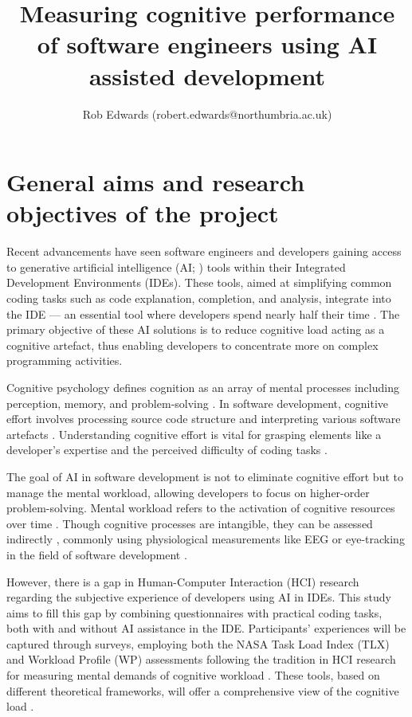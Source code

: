 \documentclass[man]{apa7}
\title{Measuring cognitive performance of software engineers using AI assisted development}
\author{Rob Edwards (robert.edwards@northumbria.ac.uk)}
\affiliation{
    Module: PE7024 - Psychological Research Experience,
    Psychology Department at Northumbria University,
    Module Lead: Dr David Smailes,
    Supervisor: ,
   }
\begin{document}
\maketitle
\onecolumn

\section{General aims and research objectives of the project}
Recent advancements have seen software engineers and developers gaining access to generative artificial intelligence (AI; \cite{Nguyen-Duc2023GenerativeAgenda}) tools within their Integrated Development Environments (IDEs). These tools, aimed at simplifying common coding tasks such as code explanation, completion, and analysis, integrate into the IDE — an essential tool where developers spend nearly half their time \parencite{Meyer2017TheProductivity}. The primary objective of these AI solutions is to reduce cognitive load acting as a cognitive artefact, thus enabling developers to concentrate more on complex programming activities.

Cognitive psychology defines cognition as an array of mental processes including perception, memory, and problem-solving \parencite{Roy2013CognitiveFunction, Benjafield2010Cognition, Allan2013Cognitions}. In software development, cognitive effort involves processing source code structure and interpreting various software artefacts \parencite{Crk2015UnderstandingExpertise, Crk2016AssessingComprehension, Minas2017NeurophysiologicalDevelopers}. Understanding cognitive effort is vital for grasping elements like a developer's expertise \parencite{Crk2016AssessingComprehension, Crk2015UnderstandingExpertise} and the perceived difficulty of coding tasks \parencite{Fritz2014UsingDevelopment, Fritz2016LeveragingProductivity}.

The goal of AI in software development is not to eliminate cognitive effort but to manage the mental workload, allowing developers to focus on higher-order problem-solving. Mental workload refers to the activation of cognitive resources over time \parencite{Longo2022HumanDefinition}. Though cognitive processes are intangible, they can be assessed indirectly \parencite{Piantadosi2023DoDevelopers}, commonly using physiological measurements like EEG or eye-tracking in the field of software development \parencite{Fritz2014UsingDevelopment, Jatupaiboon2013EmotionBands, Minas2017NeurophysiologicalDevelopers, Goncales2019MeasuringStudy}.

However, there is a gap in Human-Computer Interaction (HCI) \parencite{Carroll1997Human-computerDesign} research regarding the subjective experience of developers using AI in IDEs. This study aims to fill this gap by combining questionnaires with practical coding tasks, both with and without AI assistance in the IDE. Participants' experiences will be captured through surveys, employing both the NASA Task Load Index (TLX) and Workload Profile (WP) assessments following the tradition in HCI research for measuring mental demands of cognitive workload \parencite{Kosch2023AInteraction}. These tools, based on different theoretical frameworks, will offer a comprehensive view of the cognitive load \parencite{Rubio2004EvaluationMethods, Paxion2014Complexite}.
\end{document}
